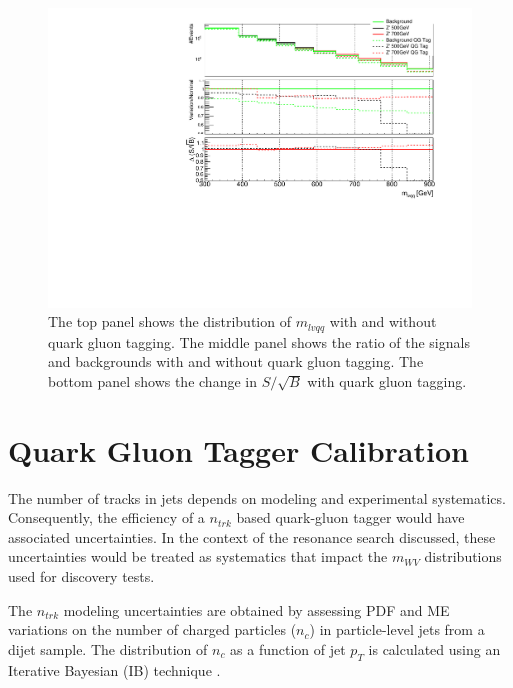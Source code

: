 \begin{figure}[h!]
  \centering
  \includegraphics[width=\hsize]{figures/QGT/s_root_b_recotag.pdf}
  \caption{The top panel shows the distribution of $m_{lvqq}$ with and without quark gluon tagging. The middle panel shows the ratio of the signals and backgrounds with and without quark gluon tagging. The bottom panel shows the change in $S/\sqrt{B}$ with quark gluon tagging.}
  \label{fig:qg_s_root_b}
\end{figure}
\FloatBarrier


\pagebreak
\pagebreak
\pagebreak
\chapter{Quark Gluon Tagger Calibration}
The number of tracks in jets depends on modeling and experimental systematics. Consequently, the efficiency of a $n_{trk}$ based quark-gluon tagger would have associated uncertainties. In the context of the resonance search discussed, these uncertainties would be treated as systematics that impact the $m_{WV}$ distributions used for discovery tests.

The $n_{trk}$ modeling uncertainties are obtained by assessing PDF and ME variations on the number of charged particles ($n_{c}$) in particle-level jets from a dijet sample. The distribution of $n_{c}$ as a function of jet $p_{T}$  is calculated using an Iterative Bayesian (IB) technique \cite{ib_unfolding}.

